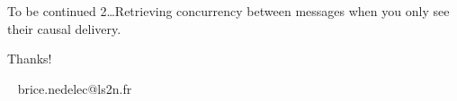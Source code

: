 \documentclass[10pt, xcolor={usenames, dvipsnames}]{beamer}
\begin{document}
\begin{frame}[standout]
  To be continued 2\ldots Retrieving concurrency between messages when you only
  see their causal delivery.

  \vspace{2em}

  \begin{center}
    
  \end{center}

\end{frame}


\begin{frame}[standout]
  
  \vspace{6em}

  Thanks!

  \vspace{5em}

  \small
  \faEnvelope ~ brice.nedelec@ls2n.fr

\end{frame}
\end{document}

